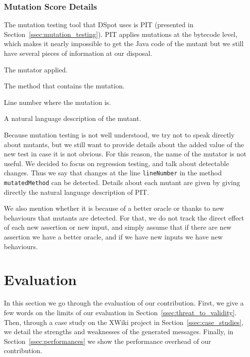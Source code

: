 \documentclass[a4paper,11pt]{sdm_internship}
\newcommand{\todo}[1]{\colorbox{Red!75}{\textcolor{white}{\textbf{TODO\ifx&#1&\else: #1\fi}}}}
\newcommand{\dspot}{DSpot\xspace}
\theoremstyle{definition}
\begin{document}
\subsubsection{Mutation Score Details}%
\label{sssec:mutants_details}
The mutation testing tool that \dspot{} uses is PIT (presented in Section~\ref{ssec:mutation_testing}).
PIT applies mutations at the bytecode level, which makes it nearly impossible to get the Java code of the mutant but we still have several pieces of information at our disposal.
\begin{description}[itemindent=0em,labelwidth=9em,leftmargin=9em,align=right]
  \item[\texttt{mutantOperator}] The mutator applied.
  \item[\texttt{mutatedMethod}] The method that contains the mutation.
  \item[\texttt{lineNumber}] Line number where the mutation is.
  \item[\texttt{description}] A natural language description of the mutant.
\end{description}

Because mutation testing is not well understood, we try not to speak directly about mutants, but we still want to provide details about the added value of the new test in case it is not obvious.
For this reason, the name of the mutator is not useful.
We decided to focus on regression testing, and talk about detectable changes.
Thus we say that changes at the line \texttt{lineNumber} in the method \texttt{mutatedMethod} can be detected.
Details about each mutant are given by giving directly the natural language description of PIT\@.

We also mention whether it is because of a better oracle or thanks to new behaviours that mutants are detected.
For that, we do not track the direct effect of each new assertion or new input, and simply assume that if there are new assertion we have a better oracle, and if we have new inputs we have new behaviours.




\section{Evaluation}%
\label{sec:eval}
In this section we go through the evaluation of our contribution.
First, we give a few words on the limits of our evaluation in Section~\ref{ssec:threat_to_validity}.
Then, through a case study on the XWiki project in Section~\ref{ssec:case_studies}, we detail the strengths and weaknesses of the generated messages.
Finally, in Section~\ref{ssec:performances} we show the performance overhead of our contribution.
\end{document}
